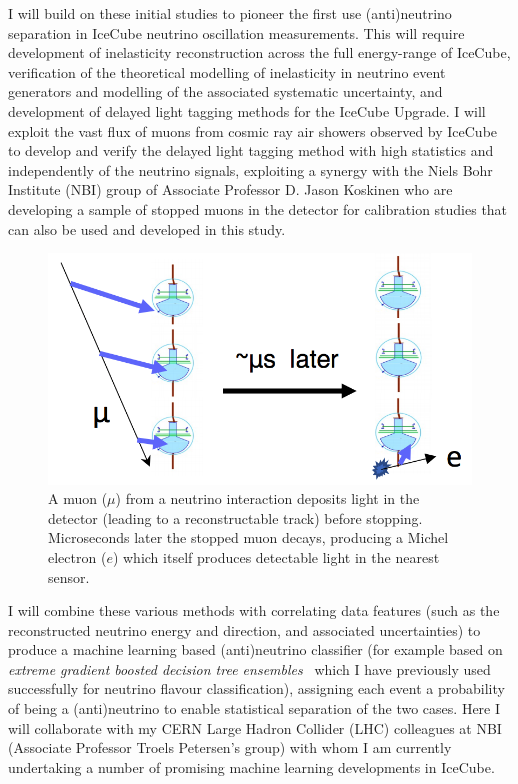 \documentclass[a4paper,11pt]{article}
\begin{document}
I will build on these initial studies to pioneer the first use (anti)neutrino separation in IceCube neutrino oscillation measurements. This will require development of inelasticity reconstruction across the full energy-range of IceCube, verification of the theoretical modelling of inelasticity in neutrino event generators and modelling of the associated systematic uncertainty, and development of delayed light tagging methods for the IceCube Upgrade. I will exploit the vast flux of muons from cosmic ray air showers observed by IceCube to develop and verify the delayed light tagging method with high statistics and independently of the neutrino signals, exploiting a synergy with the Niels Bohr Institute (NBI) group of Associate Professor D. Jason Koskinen who are developing a sample of stopped muons in the detector for calibration studies that can also be used and developed in this study. 

\begin{figure} %
    \centering
    \includegraphics[trim=0.0cm 0.0cm 0.0cm 0.0cm, clip=true, width=\linewidth]{images/michel_electron.png}
    \caption{A muon ($\mu$) from a neutrino interaction deposits light in the detector (leading to a reconstructable track) before stopping. Microseconds later the stopped muon decays, producing a Michel electron ($e$) which itself produces detectable light in the nearest sensor. }
    \label{fig:michel_electron}
\end{figure}

I will combine these various methods with correlating data features (such as the reconstructed neutrino energy and direction, and associated uncertainties) to produce a machine learning based (anti)neutrino classifier (for example based on \textit{extreme gradient boosted decision tree ensembles}~\cite{Chen:2016btl} which I have previously used successfully for neutrino flavour classification), assigning each event a probability of being a (anti)neutrino to enable statistical separation of the two cases. Here I will collaborate with my CERN Large Hadron Collider (LHC) colleagues at NBI (Associate Professor Troels Petersen's group) with whom I am currently undertaking a number of promising machine learning developments in IceCube.
\end{document}
